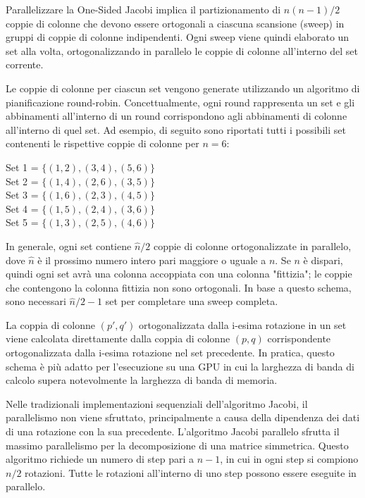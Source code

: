Parallelizzare la One-Sided Jacobi implica il partizionamento di $n(n-1)/2$ coppie di colonne che devono essere ortogonali a ciascuna scansione (sweep) in gruppi di coppie di colonne indipendenti. Ogni sweep viene quindi elaborato un set alla volta, ortogonalizzando in parallelo le coppie di colonne all'interno del set corrente.

Le coppie di colonne per ciascun set vengono generate utilizzando un algoritmo di pianificazione round-robin. Concettualmente, ogni round rappresenta un set e gli abbinamenti all'interno di un round corrispondono agli abbinamenti di colonne all'interno di quel set. Ad esempio, di seguito sono riportati tutti i possibili set contenenti le rispettive coppie di colonne per $n = 6$:
\begin{center}
	Set 1 = $\{(1,2),(3,4),(5,6)\}$\\
	Set 2 = $\{(1,4),(2,6),(3,5)\}$\\
	Set 3 = $\{(1,6),(2,3),(4,5)\}$\\
	Set 4 = $\{(1,5),(2,4),(3,6)\}$\\
	Set 5 = $\{(1,3),(2,5),(4,6)\}$\\
\end{center}
In generale, ogni set contiene $\hat{n}/2$ coppie di colonne ortogonalizzate in parallelo, dove $\hat{n}$ è il prossimo numero intero pari maggiore o uguale a $n$. Se $n$ è dispari, quindi ogni set avrà una colonna accoppiata con una colonna "fittizia"; le coppie che contengono la colonna fittizia non sono ortogonali. In base a questo schema, sono necessari $\hat{n}/2 - 1$ set per completare una sweep completa.

La coppia di colonne $(p', q')$ ortogonalizzata dalla i-esima rotazione in un set viene calcolata direttamente dalla coppia di colonne $(p, q)$ corrispondente ortogonalizzata dalla i-esima rotazione nel set precedente. In pratica, questo schema è più adatto per l'esecuzione su una GPU in cui la larghezza di banda di calcolo supera notevolmente la larghezza di banda di memoria. \cite{Romer:SVD}

Nelle tradizionali implementazioni sequenziali dell'algoritmo Jacobi, il parallelismo non viene sfruttato, principalmente a causa della dipendenza dei dati di una rotazione con la sua precedente. L'algoritmo Jacobi parallelo sfrutta il massimo parallelismo per la decomposizione di una matrice simmetrica. Questo algoritmo richiede un numero di step pari a $n - 1$, in cui in ogni step si compiono $n/2$ rotazioni. Tutte le rotazioni all'interno di uno step possono essere eseguite in parallelo. \cite{Acosta:SVD}


